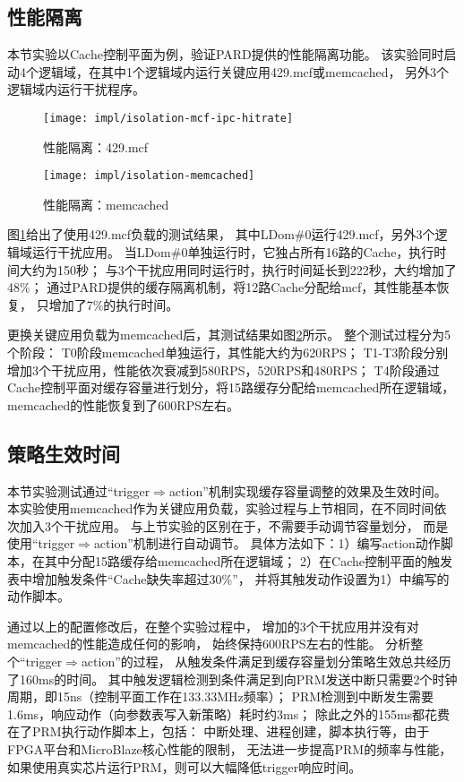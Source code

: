 \subsection{性能隔离}

本节实验以Cache控制平面为例，验证PARD提供的性能隔离功能。
该实验同时启动4个逻辑域，在其中1个逻辑域内运行关键应用429.mcf或memcached，
另外3个逻辑域内运行干扰程序。

\begin{figure}[tb]
  \centering
  \texttt{[image: impl/isolation-mcf-ipc-hitrate]}
  \caption{性能隔离：429.mcf}
  \label{fig:isolation-mcf-ipc-hitrate}
\end{figure}

\begin{figure}[tb]
  \centering
  \texttt{[image: impl/isolation-memcached]}
  \caption{性能隔离：memcached}
  \label{fig:isolation-memcached}
\end{figure}

图\ref{fig:isolation-mcf-ipc-hitrate}给出了使用429.mcf负载的测试结果，
其中LDom\#0运行429.mcf，另外3个逻辑域运行干扰应用。
当LDom\#0单独运行时，它独占所有16路的Cache，执行时间大约为150秒；
与3个干扰应用同时运行时，执行时间延长到222秒，大约增加了48\%；
通过PARD提供的缓存隔离机制，将12路Cache分配给mcf，其性能基本恢复，
只增加了7\%的执行时间。

更换关键应用负载为memcached后，其测试结果如图\ref{fig:isolation-memcached}所示。
整个测试过程分为5个阶段：
T0阶段memcached单独运行，其性能大约为620RPS；
T1-T3阶段分别增加3个干扰应用，性能依次衰减到580RPS，520RPS和480RPS；
T4阶段通过Cache控制平面对缓存容量进行划分，将15路缓存分配给memcached所在逻辑域，
memcached的性能恢复到了600RPS左右。


\subsection{策略生效时间}
\label{chap:impl:trigger-latency}

本节实验测试通过``trigger$\Rightarrow$action''机制实现缓存容量调整的效果及生效时间。
本实验使用memcached作为关键应用负载，实验过程与上节相同，在不同时间依次加入3个干扰应用。
与上节实验的区别在于，不需要手动调节容量划分，
而是使用``trigger$\Rightarrow$action''机制进行自动调节。
具体方法如下：1）编写action动作脚本，在其中分配15路缓存给memcached所在逻辑域；
2）在Cache控制平面的触发表中增加触发条件``Cache缺失率超过30\%''，
并将其触发动作设置为1）中编写的动作脚本。

通过以上的配置修改后，在整个实验过程中，
增加的3个干扰应用并没有对memcached的性能造成任何的影响，
始终保持600RPS左右的性能。
分析整个``trigger$\Rightarrow$action''的过程，
从触发条件满足到缓存容量划分策略生效总共经历了160ms的时间。
其中触发逻辑检测到条件满足到向PRM发送中断只需要2个时钟周期，即15ns（控制平面工作在133.33MHz频率）；
PRM检测到中断发生需要1.6ms，响应动作（向参数表写入新策略）耗时约3ms；
除此之外的155ms都花费在了PRM执行动作脚本上，包括：
中断处理、进程创建，脚本执行等，由于FPGA平台和MicroBlaze核心性能的限制，
无法进一步提高PRM的频率与性能，如果使用真实芯片运行PRM，则可以大幅降低trigger响应时间。

